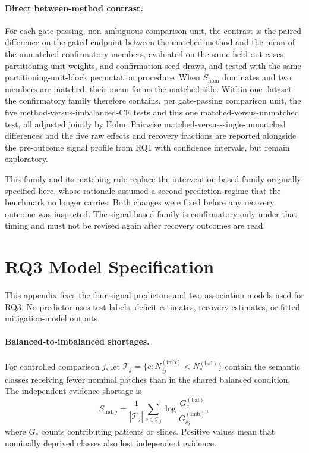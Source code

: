 \documentclass[11pt]{article}
\begin{document}
\paragraph{Direct between-method contrast.}
For each gate-passing, non-ambiguous comparison unit, the contrast is the paired difference on the gated endpoint between the matched method and the mean of the unmatched confirmatory members, evaluated on the same held-out cases, partitioning-unit weights, and confirmation-seed draws, and tested with the same partitioning-unit-block permutation procedure. When $S_{\mathrm{nom}}$ dominates and two members are matched, their mean forms the matched side. Within one dataset the confirmatory family therefore contains, per gate-passing comparison unit, the five method-versus-imbalanced-CE tests and this one matched-versus-unmatched test, all adjusted jointly by Holm. Pairwise matched-versus-single-unmatched differences and the five raw effects and recovery fractions are reported alongside the pre-outcome signal profile from RQ1 with confidence intervals, but remain exploratory.

This family and its matching rule replace the intervention-based family originally specified here, whose rationale assumed a second prediction regime that the benchmark no longer carries. Both changes were fixed before any recovery outcome was inspected. The signal-based family is confirmatory only under that timing and must not be revised again after recovery outcomes are read.

\section{RQ3 Model Specification}
\label{app:rq3}
This appendix fixes the four signal predictors and two association models used for RQ3. No predictor uses test labels, deficit estimates, recovery estimates, or fitted mitigation-model outputs.

\paragraph{Balanced-to-imbalanced shortages.}
For controlled comparison $j$, let $\mathcal T_j=\{c:N^{(\mathrm{imb})}_{cj}<N^{(\mathrm{bal})}_{c}\}$ contain the semantic classes receiving fewer nominal patches than in the shared balanced condition. The independent-evidence shortage is
\begin{equation}
  S_{\mathrm{ind},j}=\frac{1}{|\mathcal T_j|}
  \sum_{c\in\mathcal T_j}
  \log\frac{G^{(\mathrm{bal})}_{c}}{G^{(\mathrm{imb})}_{cj}},
  \label{eq:rq3-independent-shortage}
\end{equation}
\noindent where $G_c$ counts contributing patients or slides. Positive values mean that nominally deprived classes also lost independent evidence.
\end{document}
